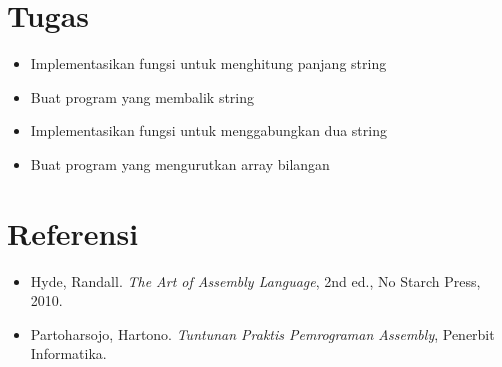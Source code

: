 \section{Tugas}
\begin{itemize}
\item Implementasikan fungsi untuk menghitung panjang string
\item Buat program yang membalik string
\item Implementasikan fungsi untuk menggabungkan dua string
\item Buat program yang mengurutkan array bilangan
\end{itemize}

\section{Referensi}
\begin{itemize}
\item Hyde, Randall. \textit{The Art of Assembly Language}, 2nd ed., No Starch Press, 2010.
\item Partoharsojo, Hartono. \textit{Tuntunan Praktis Pemrograman Assembly}, Penerbit Informatika.
\end{itemize}

